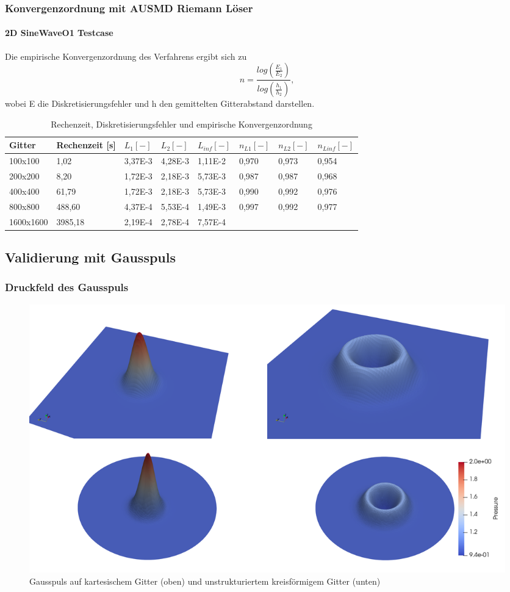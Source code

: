 \documentclass[
	11pt, %
	aspectratio=169, %
]{beamer}
\begin{document}
\begin{frame}
		\frametitle{Konvergenzordnung mit AUSMD Riemann Löser}
		\framesubtitle{2D SineWaveO1 Testcase} %
		
		Die empirische Konvergenzordnung des Verfahrens ergibt sich zu
		$$n=\frac{log(\frac{E_1}{E_2})}{log(\frac{h_1}{h_2})},$$
		wobei E die Diskretisierungsfehler und h den gemittelten Gitterabstand darstellen.
		
		\begin{table}
			\begin{tabular}{l l l l l l l l}
				\toprule
				Gitter& Rechenzeit [s] & $L_1 [-]$ & $L_2 [-]$ & $L_{inf} [-]$ & $n_{L1} [-]$ & $n_{L2} [-]$ & $n_{Linf} [-]$ \\
				\midrule
				100x100 & 1,02 & 3,37E-3 & 4,28E-3 & 1,11E-2 & 0,970 & 0,973 & 0,954\\
				200x200 & 8,20 & 1,72E-3 & 2,18E-3 & 5,73E-3 &0,987 & 0,987 & 0,968 \\
				400x400 & 61,79 & 1,72E-3 & 2,18E-3 & 5,73E-3 & 0,990 & 0,992 & 0,976 \\
				800x800 & 488,60 & 4,37E-4 & 5,53E-4 & 1,49E-3 & 0,997 & 0,992 & 0,977 \\
				1600x1600 & 3985,18 & 2,19E-4 & 2,78E-4 & 7,57E-4 \\
				\bottomrule
			\end{tabular}
			\caption{Rechenzeit, Diskretisierungsfehler und empirische Konvergenzordnung}
		\end{table}
\end{frame}
	

\subsection{Validierung mit Gausspuls}
\begin{frame}
\frametitle{Druckfeld des Gausspuls}

\begin{figure}
	\includegraphics[width=0.7\linewidth]{gausspulse_collage.png}
	\caption{Gausspuls auf kartesischem Gitter (oben) und unstrukturiertem kreisförmigem Gitter (unten)}
\end{figure}
\end{frame}
\end{document}
